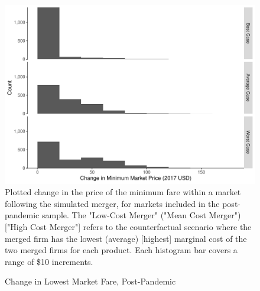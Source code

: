 \documentclass{article}
\begin{document}
\begin{appendices}
	\begin{figure}
		\caption{Change in Lowest Market Fare, Post-Pandemic}
		\label{fig:LowestMarketChange_Post}
		\includegraphics[width = \linewidth]{Merger_Change_MinimumFare}
		\footnotesize{Plotted change in the price of the minimum fare within a market following the simulated merger, for markets included in the post-pandemic sample. The "Low-Cost Merger" ("Mean Cost Merger") ["High Cost Merger"] refers to the counterfactual scenario where the merged firm has the lowest (average) [highest] marginal cost of the two merged firms for each product. Each histogram bar covers a range of \$10 increments.}
	\end{figure}
	
	

	
\end{appendices}
	
\end{document}
